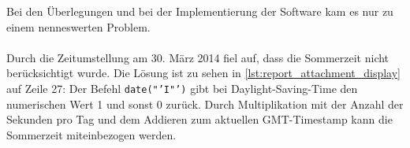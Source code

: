 Bei den Überlegungen und bei der Implementierung der Software kam es nur zu einem nenneswerten Problem.\\
\\
Durch die Zeitumstellung am 30. März 2014 fiel auf, dass die Sommerzeit nicht berücksichtigt wurde. Die Lösung ist zu sehen in \autoref{lst:report_attachment_display} auf Zeile 27: Der Befehl \texttt{date("'I"')} gibt bei Daylight-Saving-Time den numerischen Wert 1 und sonst 0 zurück. Durch Multiplikation mit der Anzahl der Sekunden pro Tag und dem Addieren zum aktuellen GMT-Timestamp kann die Sommerzeit miteinbezogen werden.